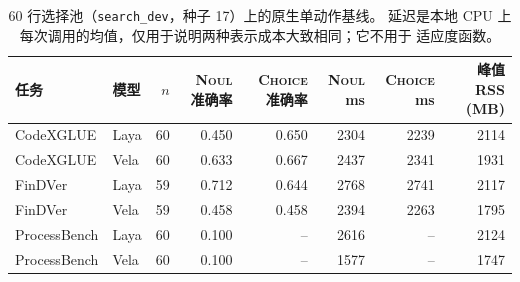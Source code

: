 \begin{table}[t]
\centering
\small
\caption{60 行选择池（\texttt{search\_dev}，种子 17）上的原生单动作基线。
延迟是本地 CPU 上每次调用的均值，仅用于说明两种表示成本大致相同；它不用于
适应度函数。}
\label{tab:native}
\begin{tabular}{@{}llrrrrrr@{}}
\toprule
任务 & 模型 & $n$ & \textsc{Noul} 准确率 & \textsc{Choice} 准确率 & \textsc{Noul} ms & \textsc{Choice} ms & 峰值 RSS (MB) \\
\midrule
CodeXGLUE & Laya & 60 & 0.450 & 0.650 & 2304 & 2239 & 2114 \\
CodeXGLUE & Vela & 60 & 0.633 & 0.667 & 2437 & 2341 & 1931 \\
FinDVer & Laya & 59 & 0.712 & 0.644 & 2768 & 2741 & 2117 \\
FinDVer & Vela & 59 & 0.458 & 0.458 & 2394 & 2263 & 1795 \\
ProcessBench & Laya & 60 & 0.100 & -- & 2616 & -- & 2124 \\
ProcessBench & Vela & 60 & 0.100 & -- & 1577 & -- & 1747 \\
\bottomrule
\end{tabular}
\end{table}
